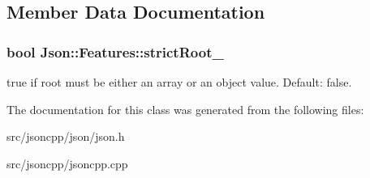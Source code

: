 \subsection{Member Data Documentation}
\subsubsection[{\texorpdfstring{strict\+Root\+\_\+}{strictRoot_}}]{\setlength{\rightskip}{0pt plus 5cm}bool Json\+::\+Features\+::strict\+Root\+\_\+}\hypertarget{classJson_1_1Features_a1162c37a1458adc32582b585b552f9c3}{}\label{classJson_1_1Features_a1162c37a1458adc32582b585b552f9c3}
{\ttfamily true} if root must be either an array or an object value. Default\+: {\ttfamily false}. 

The documentation for this class was generated from the following files\+:\begin{DoxyCompactItemize}
\item 
src/jsoncpp/json/json.\+h\item 
src/jsoncpp/jsoncpp.\+cpp\end{DoxyCompactItemize}
